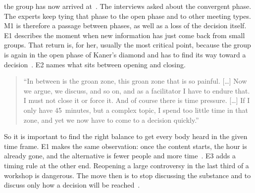 the group has now arrived at~.
The interviews asked about the convergent phase.
The experts keep tying that phase to the open phase and to other meeting types.
M1 is therefore a passage between phases, as well as a loss of the decision itself.
E1 describes the moment when new information has just come back from small groups.
That return is, for her, usually the most critical point, because the group is again in the
open phase of Kaner's diamond and has to find its way toward a decision~.
E2 names what sits between opening and closing.
{\setlength{\topsep}{0.25\baselineskip}\setlength{\partopsep}{0pt}%
  \begin{quote}\small
    \enquote{In between is the groan zone, this groan zone that is so painful. [\ldots] Now we
      argue, we discuss, and so on, and as a facilitator I have to endure that. I must not close
      it or force it. And of course there is time pressure. [\ldots] If I only have 45~minutes,
      but a complex topic, I spend too little time in that zone, and yet we now have to come to
    a decision quickly.}~
\end{quote}}
So it is important to find the right balance to get every body heard in the given time frame.
E1 makes the same observation: once the content starts, the hour is already
gone, and the alternative is fewer people and more time~.
E3 adds a timing rule at the other end.
Reopening a large controversy in the last third of a workshop is dangerous.
The move then is to stop discussing the substance and to discuss only how a decision will
be reached~.

